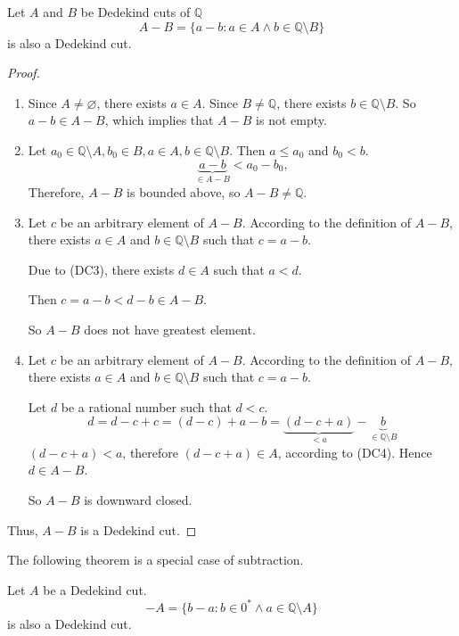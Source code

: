 \begin{theorem}[Subtraction]
    Let $A$ and $B$ be Dedekind cuts of $\mathbb{Q}$
    \[
        A - B = \{ a - b: a\in A\land b\in\mathbb{Q}\setminus B \}
    \]
    is also a Dedekind cut.
\end{theorem}

\begin{proof}
    \begin{enumerate}[label = (\roman*)]
        \item Since $A\ne\varnothing$, there exists $a\in A$. Since $B\ne\mathbb{Q}$, there exists $b\in\mathbb{Q}\setminus B$. So $a - b\in A - B$, which implies that $A - B$ is not empty.
        \item Let $a_{0}\in\mathbb{Q}\setminus A, b_{0}\in B, a\in A, b\in\mathbb{Q}\setminus B$. Then $a\le a_{0}$ and $b_{0} < b$.
              \[
                  \underbrace{a - b}_{\in A - B} < a_{0} - b_{0},
              \]
              Therefore, $A - B$ is bounded above, so $A - B\ne\mathbb{Q}$.
        \item Let $c$ be an arbitrary element of $A - B$. According to the definition of $A - B$, there exists $a\in A$ and $b\in\mathbb{Q}\setminus B$ such that $c = a - b$.

              Due to (DC3), there exists $d\in A$ such that $a < d$.

              Then $c = a - b < d - b \in A - B$.

              So $A - B$ does not have greatest element.
        \item Let $c$ be an arbitrary element of $A - B$. According to the definition of $A - B$, there exists $a\in A$ and $b\in\mathbb{Q}\setminus B$ such that $c = a - b$.

              Let $d$ be a rational number such that $d < c$.
              \[
                  d = d - c + c = (d - c) + a - b = \underbrace{(d - c + a)}_{< a} - \underbrace{b}_{\in\mathbb{Q}\setminus B}
              \]
              $(d - c + a) < a$, therefore $(d - c + a)\in A$, according to (DC4). Hence $d\in A - B$.

              So $A - B$ is downward closed.
    \end{enumerate}
    Thus, $A - B$ is a Dedekind cut.
\end{proof}

The following theorem is a special case of subtraction.

\begin{theorem}
    Let $A$ be a Dedekind cut.
    \[
        -A = \{ b - a : b\in{0}^{*} \wedge a\in\mathbb{Q}\setminus A \}
    \]
    is also a Dedekind cut.
\end{theorem}

